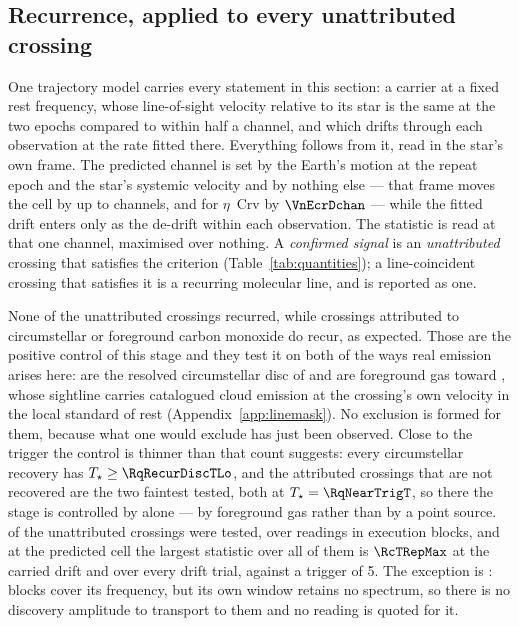 \subsection{Recurrence, applied to every unattributed crossing}
\label{sec:etacrv}

One trajectory model carries every statement in this section: a carrier at a
fixed rest frequency, whose line-of-sight velocity relative to its star is the
same at the two epochs compared to within half a channel, and which drifts
through each observation at the rate fitted there. Everything follows from it,
read in the star's own frame. The predicted channel is set by the Earth's
motion at the repeat epoch and the star's systemic velocity and by nothing
else --- that frame moves the cell by up to \ZtFrameChanMax{} channels, and
for $\eta$~Crv by $\VnEcrDchan$ --- while the fitted drift enters only as the
de-drift within each observation. The statistic is read at that one channel,
maximised over nothing. A
\emph{confirmed signal} is an \emph{unattributed} crossing that satisfies the
criterion (Table~\ref{tab:quantities}); a line-coincident crossing that
satisfies it is a recurring molecular line, and is reported as one.

None of the unattributed crossings recurred, while \MkAttrRecur{} crossings
attributed to circumstellar or foreground carbon monoxide do recur, as
expected. Those \MkAttrRecur{} are the positive control of this stage and they
test it on both of the ways real emission arises here: \RqNRecurDisc{} are the
resolved circumstellar disc of \RqRecurDiscStars{} and \RqNRecurCloud{} are
foreground gas toward \RqRecurCloudStars, whose sightline carries catalogued
cloud emission at the crossing's own velocity in the local standard of rest
(Appendix~\ref{app:linemask}). No exclusion is formed for them, because what
one would exclude has just been observed. Close to the trigger the control is
thinner than that count suggests: every circumstellar recovery has
$T_\star\ge\RqRecurDiscTLo$, and the \RqNearTrigN{} attributed crossings that
are not recovered are the two faintest tested, both at
$T_\star=\RqNearTrigT$, so there the stage is controlled by
\RqRecurCloudStars{} alone --- by foreground gas rather than by a point
source. \RcNExclPoss{} of the \RcNTested{} unattributed crossings were
tested, over \RcNRepeatMeas{} readings in \RcNRepeatBlock{} execution blocks,
and at the predicted cell the largest statistic over all of them is
$\RcTRepMax$ at the carried drift and \RcTMax{} over every drift trial,
against a trigger of 5. The exception is \RcUntStar{} \texttt{\RcUntEb}:
\RcUntNRep{} blocks cover its frequency, but its own window retains no
spectrum, so there is no discovery amplitude to transport to them and no
reading is quoted for it.

